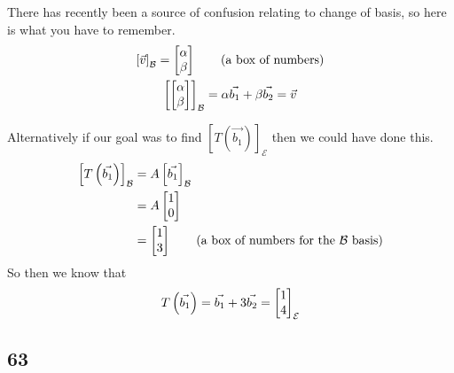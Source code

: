 \documentclass[11pt]{book}
\begin{document}
\begin{remark}
    There has recently been a source of confusion relating to change of basis, so here is what you have to remember.
    \begin{gather*}
        \left[ \vec{v}  \right]_{\mathcal{B}} =  \begin{bmatrix} \alpha  \\ \beta  \end{bmatrix} \tag{a box of numbers}\\
        \left[ \begin{bmatrix} \alpha  \\ \beta  \end{bmatrix}  \right]_{\mathcal{B}} =  \alpha \vec{b_1}  + \beta \vec{b_2} =  \vec{v} 
    \end{gather*}
\end{remark}

\begin{eg}
    Alternatively if our goal was to find $\left[ T\left(\vec{b_1} \right) \right]_{\mathcal{E}} $ then we could have done this.
    \begin{align*}
        \left[ T\left(\vec{b_1} \right) \right]_{\mathcal{B}} &=  A\left[ \vec{b_1}  \right]_{\mathcal{B}} \\  
        &= A \mat{ 1 \\ 0 }  \\
        &= \mat{ 1 \\ 3 } \tag{a box of numbers for the $\mathcal{B}$ basis}
    \end{align*}
    So then we know that 
    \[
    T\left(\vec{b_1} \right)=  \vec{b_1}  + 3\vec{b_2} =  \begin{bmatrix} 1 \\ 4 \end{bmatrix} _{\mathcal{E} } 
    \]
\end{eg}

\subsection{63}%
\label{sub:63}
\end{document}
